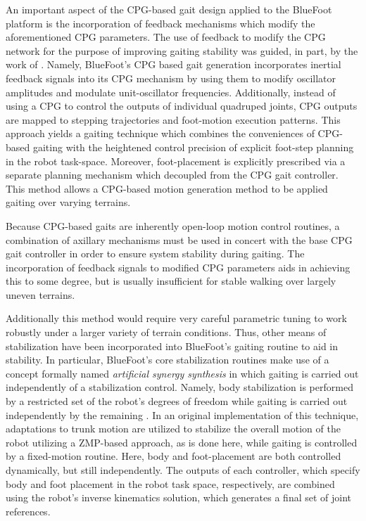 		An important aspect of the CPG-based gait design applied to the BlueFoot platform is the incorporation of feedback mechanisms which modify the aforementioned CPG parameters. The use of feedback to modify the CPG network for the purpose of improving gaiting stability was guided, in part, by the work of \cite{Fukuoka2003,Endo2004}. Namely, BlueFoot's CPG based gait generation incorporates inertial feedback signals into its CPG mechanism by using them to modify oscillator amplitudes and modulate unit-oscillator frequencies. Additionally, instead of using a CPG to control the outputs of individual quadruped joints, CPG outputs are mapped to stepping trajectories and foot-motion execution patterns. This approach yields a gaiting technique which combines the conveniences of CPG-based gaiting with the heightened control precision of explicit foot-step planning in the robot task-space. Moreover, foot-placement is explicitly prescribed via a separate planning mechanism which decoupled from the CPG gait controller. This method allows a CPG-based motion generation method to be applied gaiting over varying terrains.

		Because CPG-based gaits are inherently open-loop motion control routines, a combination of axillary mechanisms must be used in concert with the base CPG gait controller in order to ensure system stability during gaiting. The incorporation of feedback signals to modified CPG parameters aids in achieving this to some degree, but is usually insufficient for stable walking over largely uneven terrains. 
		
		Additionally this method would require very careful parametric tuning to work robustly under a larger variety of terrain conditions. Thus, other means of stabilization have been incorporated into BlueFoot's gaiting routine to aid in stability. In particular, BlueFoot's core stabilization routines make use of a concept formally named \emph{artificial synergy synthesis} in which gaiting is carried out independently of a stabilization control. Namely, body stabilization is performed by a restricted set of the robot's degrees of freedom while gaiting is carried out independently by the remaining \cite{Vuko1972,Yamaguchi1993}. In an original implementation of this technique, adaptations to trunk motion are utilized to stabilize the overall motion of the robot utilizing a ZMP-based approach, as is done here, while gaiting is controlled by a fixed-motion routine. Here, body and foot-placement are both controlled dynamically, but still independently. The outputs of each controller, which specify body and foot placement in the robot task space, respectively, are combined using the robot's inverse kinematics solution, which generates a final set of joint references.


